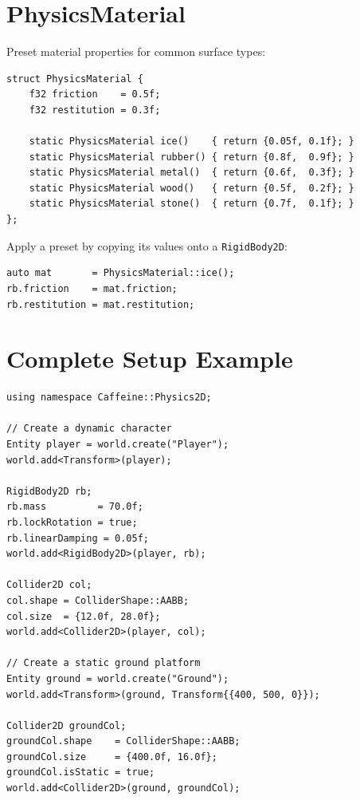 \section{PhysicsMaterial}

Preset material properties for common surface types:

\begin{lstlisting}
struct PhysicsMaterial {
    f32 friction    = 0.5f;
    f32 restitution = 0.3f;

    static PhysicsMaterial ice()    { return {0.05f, 0.1f}; }
    static PhysicsMaterial rubber() { return {0.8f,  0.9f}; }
    static PhysicsMaterial metal()  { return {0.6f,  0.3f}; }
    static PhysicsMaterial wood()   { return {0.5f,  0.2f}; }
    static PhysicsMaterial stone()  { return {0.7f,  0.1f}; }
};
\end{lstlisting}

Apply a preset by copying its values onto a \texttt{RigidBody2D}:

\begin{lstlisting}
auto mat       = PhysicsMaterial::ice();
rb.friction    = mat.friction;
rb.restitution = mat.restitution;
\end{lstlisting}

\section{Complete Setup Example}

\begin{lstlisting}
using namespace Caffeine::Physics2D;

// Create a dynamic character
Entity player = world.create("Player");
world.add<Transform>(player);

RigidBody2D rb;
rb.mass         = 70.0f;
rb.lockRotation = true;
rb.linearDamping = 0.05f;
world.add<RigidBody2D>(player, rb);

Collider2D col;
col.shape = ColliderShape::AABB;
col.size  = {12.0f, 28.0f};
world.add<Collider2D>(player, col);

// Create a static ground platform
Entity ground = world.create("Ground");
world.add<Transform>(ground, Transform{{400, 500, 0}});

Collider2D groundCol;
groundCol.shape    = ColliderShape::AABB;
groundCol.size     = {400.0f, 16.0f};
groundCol.isStatic = true;
world.add<Collider2D>(ground, groundCol);
\end{lstlisting}
